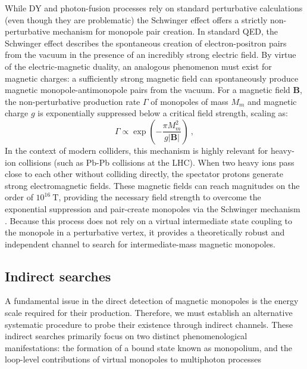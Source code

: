 \documentclass[a4paper,11pt]{article}
\begin{document}
While DY and photon-fusion processes rely on standard perturbative calculations (even though they are problematic) the Schwinger effect offers a strictly non-perturbative mechanism for monopole pair creation. In standard QED, the Schwinger effect describes the spontaneous creation of electron-positron pairs from the vacuum in the presence of an incredibly strong electric field. By virtue of the electric-magnetic duality, an analogous phenomenon must exist for magnetic charges: a sufficiently strong magnetic field can spontaneously produce magnetic monopole-antimonopole pairs from the vacuum. For a magnetic field $\boldsymbol{B}$, the non-perturbative production rate $\Gamma$ of monopoles of mass $M_m$ and magnetic charge $g$ is exponentially suppressed below a critical field strength, scaling as:
\begin{equation}
    \Gamma \propto \exp\left(-\frac{\pi M_m^2}{g|\boldsymbol{B}|}\right)\ ,
\end{equation}
In the context of modern colliders, this mechanism is highly relevant for heavy-ion collisions (such as Pb-Pb collisions at the LHC). When two heavy ions pass close to each other without colliding directly, the spectator protons generate strong electromagnetic fields. These magnetic fields can reach magnitudes on the order of $10^{16}\ \text{T}$, providing the necessary field strength to overcome the exponential suppression and pair-create monopoles via the Schwinger mechanism \cite{MoEDAL2022}. Because this process does not rely on a virtual intermediate state coupling to the monopole in a perturbative vertex, it provides a theoretically robust and independent channel to search for intermediate-mass magnetic monopoles.

\subsection{Indirect searches}
A fundamental issue in the direct detection of magnetic monopoles is the energy scale required for their production. Therefore, we must establish an alternative systematic procedure to probe their existence through indirect channels. These indirect searches primarily focus on two distinct phenomenological manifestations: the formation of a bound state known as monopolium, and the loop-level contributions of virtual monopoles to multiphoton processes
\end{document}
